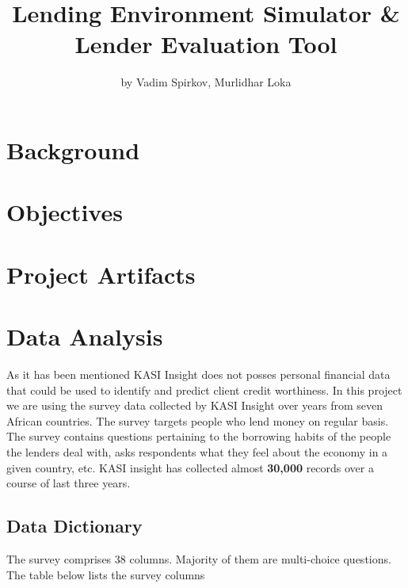 \title{Lending Environment Simulator \& Lender Evaluation Tool}
\author{by Vadim Spirkov, Murlidhar Loka}

\maketitle



\hypertarget{background}{%
\section{Background}\label{background}}

\hypertarget{objectives}{%
\section{Objectives}\label{objectives}}

\hypertarget{project-artifacts}{%
\section{Project Artifacts}\label{project-artifacts}}

\hypertarget{data-analysis}{%
\section{Data Analysis}\label{data-analysis}}

As it has been mentioned KASI Insight does not posses personal financial
data that could be used to identify and predict client credit
worthiness. In this project we are using the survey data collected by
KASI Insight over years from seven African countries. The survey targets
people who lend money on regular basis. The survey contains questions
pertaining to the borrowing habits of the people the lenders deal with,
asks respondents what they feel about the economy in a given country,
etc. KASI insight has collected almost \textbf{30,000} records over a
course of last three years.

\hypertarget{data-dictionary}{%
\subsection{Data Dictionary}\label{data-dictionary}}

The survey comprises 38 columns. Majority of them are multi-choice
questions. The table below lists the survey columns

